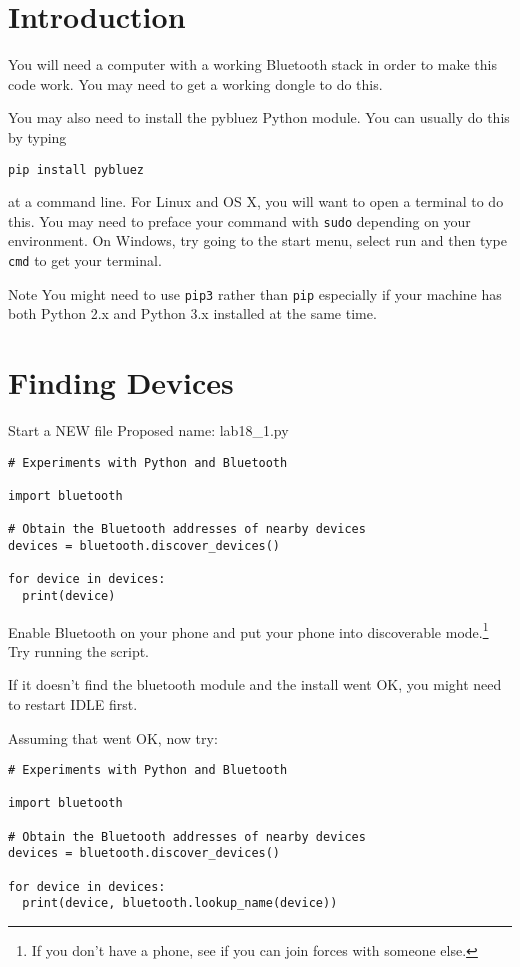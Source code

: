 \documentclass[12pt,oneside]{cttutorial}
\begin{document}
\section{Introduction}

You will need a computer with a working Bluetooth stack in order to make this code work. You may need to get a working dongle to do this.

You may also need to install the pybluez Python module. You can usually do this by typing

\begin{lstlisting}
pip install pybluez
\end{lstlisting}

at a command line. For Linux and OS X, you will want to open a terminal to do this. You may need to preface your command with \lstinline!sudo! depending on your environment. On Windows, try going to the start menu, select run and then type \lstinline!cmd! to get your terminal.

\alert{Note} You might need to use \lstinline!pip3! rather than \lstinline!pip! especially if your machine has both Python 2.x and Python 3.x installed at the same time.

\section{Finding Devices}

\alert{Start a NEW file}
Proposed name: lab18\_1.py

\begin{lstlisting}
# Experiments with Python and Bluetooth

import bluetooth

# Obtain the Bluetooth addresses of nearby devices
devices = bluetooth.discover_devices()

for device in devices:
  print(device)
\end{lstlisting}

Enable Bluetooth on your phone and put your phone into discoverable mode.\footnote{If you don't have a phone, see if you can join forces with someone else.} Try running the script.

If it doesn't find the bluetooth module and the install went OK, you might need to restart IDLE first.

Assuming that went OK, now try:

\begin{lstlisting}
# Experiments with Python and Bluetooth

import bluetooth

# Obtain the Bluetooth addresses of nearby devices
devices = bluetooth.discover_devices()

for device in devices:
  print(device, bluetooth.lookup_name(device))
\end{lstlisting}
\end{document}

